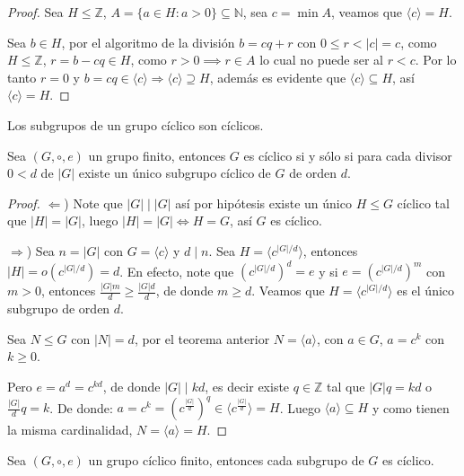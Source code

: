 \begin{proof}
	Sea $H \le \mathbb{Z}$, $A = \{ a \in H : a > 0 \} \subseteq \mathbb{N}$, sea $c = \min A$, veamos que $\langle c \rangle = H$.

	Sea $b \in H$, por el algoritmo de la división $b = cq + r$ con $0 \le r < |c| = c$, como $H \le \mathbb{Z}$, $r = b - cq \in H$, como $r > 0 \implies r \in A$ lo cual no puede ser al $r < c$. Por lo tanto $r=0$ y $b = cq \in \langle c \rangle \Rightarrow \langle c \rangle \supseteq H$, además es evidente que $\langle c \rangle \subseteq H$, así $\langle c \rangle = H$.
\end{proof}

\begin{prop}
	Los subgrupos de un grupo cíclico son cíclicos.
\end{prop}

\begin{prop}
	Sea $(G, \circ, e)$ un grupo finito, entonces $G$ es cíclico si y sólo si para cada divisor $0 < d$ de $|G|$ existe un único subgrupo cíclico de $G$ de orden $d$.
\end{prop}

\begin{proof}
	$\Leftarrow$) Note que $|G| \mid |G|$ así por hipótesis existe un único $H \le G$ cíclico tal que $|H| = |G|$, luego $|H| = |G| \iff H = G$, así $G$ es cíclico.

	$\Rightarrow$) Sea $n = |G|$ con $G = \langle c \rangle$ y $d \mid n$. Sea $H = \langle c^{|G|/d} \rangle$, entonces $|H| = o(c^{|G|/d}) = d$. En efecto, note que $(c^{|G|/d})^d = e$ y si $e = (c^{|G|/d})^m$ con $m > 0$, entonces $\frac{|G|m}{d} \ge \frac{|G|d}{d}$, de donde $m \ge d$.
	Veamos que $H = \langle c^{|G|/d} \rangle$ es el único subgrupo de orden $d$.

	Sea $N \le G$ con $|N|=d$, por el teorema anterior $N = \langle a \rangle$, con $a \in G$, $a = c^k$ con $k \ge 0$.

	Pero $e = a^d = c^{kd}$, de donde $|G| \mid kd$, es decir existe $q \in \mathbb{Z}$ tal que $|G|q = kd$ o $\frac{|G|}{d}q = k$. De donde: $a = c^k = (c^{\frac{|G|}{d}})^q \in \langle c^{\frac{|G|}{d}} \rangle = H$. Luego $\langle a \rangle \subseteq H$ y como tienen la misma cardinalidad, $N = \langle a \rangle = H$.
\end{proof}

\begin{prop}
	Sea $(G, \circ, e)$ un grupo cíclico finito, entonces cada subgrupo de $G$ es cíclico.
\end{prop}

